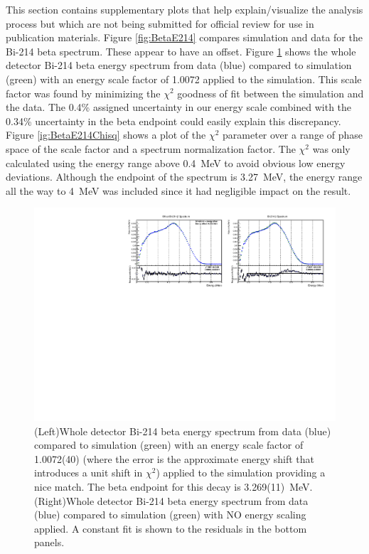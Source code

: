 This section contains supplementary plots that help explain/visualize the analysis process but which are not being submitted for official review for use in publication materials.
Figure \ref{fig:BetaE214} compares simulation and data for the Bi-214 beta spectrum. These appear to have an offset. Figure \ref{fig:BetaE214res} shows the whole detector Bi-214 beta energy spectrum from data (blue) compared to simulation (green) with an energy scale factor of 1.0072 applied to the simulation. This scale factor was found by minimizing the $\chi^2$ goodness of fit between the simulation and the data. The 0.4\% assigned uncertainty in our energy scale combined with the 0.34\%  uncertainty in the beta endpoint could easily explain this discrepancy.   Figure \ref{ig:BetaE214Chisq} shows a plot of the $\chi^2$ parameter over a range of phase space of the scale factor and a spectrum normalization factor. The $\chi^2$ was only calculated using the energy range above 0.4~MeV to avoid obvious low energy deviations. Although the endpoint of the spectrum is 3.27~MeV, the energy range all the way to 4~MeV was included since it had negligible impact on the result.   
\begin{figure}[!h]%
	\centering
	\includegraphics[width=1.0\textwidth]{figures/Bi214BetaSpectrumDataMC.pdf}
	\caption{\label{fig:BetaE214res}(Left)Whole detector Bi-214 beta energy spectrum from data (blue) compared to simulation (green) with an energy scale factor of 1.0072(40) (where the error is the approximate energy shift that introduces a unit shift in $\chi^2$) applied to the simulation providing a nice match. The beta endpoint for this decay is 3.269(11)~MeV. (Right)Whole detector Bi-214 beta energy spectrum from data (blue) compared to simulation (green) with NO energy scaling applied. A constant fit is shown to the residuals in the bottom panels.}
\end{figure}
